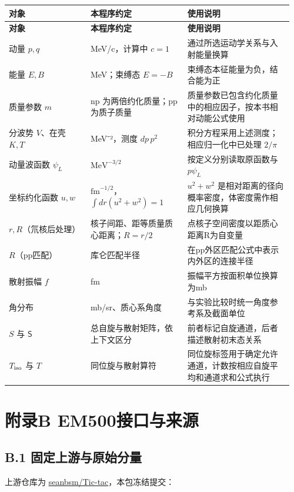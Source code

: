 \documentclass[UTF8,a4paper,zihao=5,fontset=fandol]{ctexart}
\begin{document}
{\small\setlength{\tabcolsep}{3pt}\renewcommand{\arraystretch}{1.28}
\begin{longtable}{@{}>{\raggedright\arraybackslash}p{0.2784\linewidth}>{\raggedright\arraybackslash}p{0.3264\linewidth}>{\raggedright\arraybackslash}p{0.3552\linewidth}@{}}\toprule
\textbf{对象} & \textbf{本程序约定} & \textbf{使用说明}\\\midrule
\endfirsthead
\textbf{对象} & \textbf{本程序约定} & \textbf{使用说明}\\\midrule
\endhead
动量 \(p,q\) & MeV/c，计算中 \(c=1\) & 通过所选运动学关系与入射能量换算\\
能量 \(E,B\) & MeV；束缚态 \(E=-B\) & 束缚态本征能量为负，结合能为正\\
质量参数 \(m\) & np 为两倍约化质量；pp 为质子质量 & 质量参数已包含约化质量中的相应因子，按本书相对动能公式使用\\
分波势 \(V\)、在壳 \(K,T\) & MeV⁻²，测度 \(dp\,p^2\) & 积分方程采用上述测度；相应归一化中已处理 \(2/\pi\)\\
动量波函数 \(\psi_L\) & \(\mathrm{MeV}^{-3/2}\) & 按定义分别读取原函数与 \(p\psi_L\)\\
坐标约化函数 \(u,w\) & \(\mathrm{fm}^{-1/2}\)，\(\int dr(u^2+w^2)=1\) & \(u^2+w^2\) 是相对距离的径向概率密度，体密度需作相应几何换算\\
\(r,R\)（氘核后处理） & 核子间距、距等质量质心距离；\(R=r/2\) & 点核子空间密度以距质心距离R为自变量\\
\(R\)（pp匹配） & 库仑匹配半径 & 在pp外区匹配公式中表示内外区的连接半径\\
散射振幅 \(f\) & fm & 振幅平方按面积单位换算为mb\\
角分布 & mb/sr、质心系角度 & 与实验比较时统一角度参考系及截面单位\\
\(S\) 与 \(\mathsf S\) & 总自旋与散射矩阵，依上下文区分 & 前者标记自旋通道，后者描述散射初末态关系\\
\(T_{\rm iso}\) 与 \(T\) & 同位旋与散射算符 & 同位旋标签用于确定允许通道，计数按相应自旋平均和通道求和公式执行\\
\bottomrule\end{longtable}}
\clearpage\section*{附录B EM500接口与来源}
\subsection*{B.1 固定上游与原始分量}
上游仓库为 \href{https://github.com/seanbsm/Tic-tac}{seanbsm/Tic-tac}，本包冻结提交：
\end{document}
